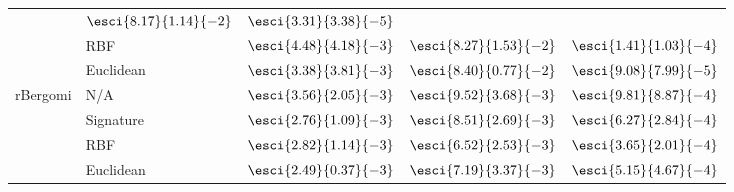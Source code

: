 \begin{table}[t]
{\begin{tabular}{llrrr}
 & \textcolor{ForestGreen}{\textbf{$\esci{8.17}{1.14}{-2}$}}
 & \textcolor{ForestGreen}{\textbf{$\esci{3.31}{3.38}{-5}$}} \\
 & RBF
 & $\esci{4.48}{4.18}{-3}$
 & \textcolor{Orange}{\textbf{$\esci{8.27}{1.53}{-2}$}}
 & $\esci{1.41}{1.03}{-4}$ \\
 & Euclidean
 & \textcolor{Orange}{\textbf{$\esci{3.38}{3.81}{-3}$}}
 & $\esci{8.40}{0.77}{-2}$
 & \textcolor{Orange}{\textbf{$\esci{9.08}{7.99}{-5}$}} \\
\midrule
\multirow{4}{*}{rBergomi}
 & N/A
 & $\esci{3.56}{2.05}{-3}$
 & $\esci{9.52}{3.68}{-3}$
 & $\esci{9.81}{8.87}{-4}$ \\
 & Signature
 & \textcolor{Orange}{\textbf{$\esci{2.76}{1.09}{-3}$}}
 & $\esci{8.51}{2.69}{-3}$
 & $\esci{6.27}{2.84}{-4}$ \\
 & RBF
 & $\esci{2.82}{1.14}{-3}$
 & \textcolor{ForestGreen}{\textbf{$\esci{6.52}{2.53}{-3}$}}
 & \textcolor{ForestGreen}{\textbf{$\esci{3.65}{2.01}{-4}$}} \\
 & Euclidean
 & \textcolor{ForestGreen}{\textbf{$\esci{2.49}{0.37}{-3}$}}
 & \textcolor{Orange}{\textbf{$\esci{7.19}{3.37}{-3}$}}
 & \textcolor{Orange}{\textbf{$\esci{5.15}{4.67}{-4}$}} \\
\bottomrule
\end{tabular}
} %
\end{table}